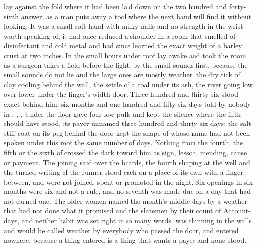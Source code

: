 
 lay against the fold where it had been laid down on the two hundred and forty-sixth answer, as a man puts away a tool where the next hand will find it without looking. It was a small soft hand with milky nails and no strength in the wrist worth speaking of; it had once reduced a shoulder in a room that smelled of disinfectant and cold metal and had since learned the exact weight of a barley crust at two inches. In the small hours under  roof  lay awake and took the room as a surgeon takes a field before the light, by the small sounds first, because the small sounds do not lie and the large ones are mostly weather: the dry tick of clay cooling behind the wall, the settle of a coal under its ash, the river going low over lower under the finger's-width door. Three hundred and thirty-six stood exact behind him, six months and one hundred and fifty-six days told by nobody in , , . Under the floor  gave four low pulls and kept the silence where the fifth should have stood, its payer unnamed three hundred and thirty-six days; the salt-stiff coat on its peg behind the door kept the shape of  whose name had not been spoken under this roof the same number of days. Nothing from the fourth, the fifth or the sixth of  crossed the dark toward him as sign, lesson, mending, cause or payment. The joining said over the boards, the fourth shaping at the well and the turned writing of the runner stood each on a place of its own with a finger between, and were not joined, spent or promoted in the night. Six openings in six months were six and not a rule, and no seventh was made due on a day that had not earned one. The older women named the month's middle days by a weather that had not done what it promised and the slatemen by their count of Account-days, and neither habit was set right in so many words.  was thinning in the walls and would be called weather by everybody who passed the door, and entered nowhere, because a thing entered is a thing that wants a payer and none stood.

